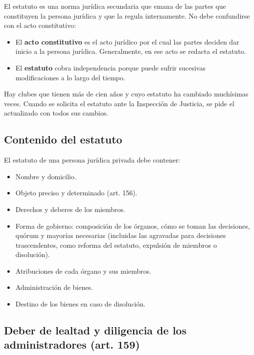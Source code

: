 \documentclass[12pt,oneside]{book}
\begin{document}
El estatuto es una norma jurídica secundaria que emana de las partes que constituyen la persona jurídica y que la regula internamente. No debe confundirse con el acto constitutivo:

\begin{itemize}
    \item El \textbf{acto constitutivo} es el acto jurídico por el cual las partes deciden dar inicio a la persona jurídica. Generalmente, en ese acto se redacta el estatuto.
    \item El \textbf{estatuto} cobra independencia porque puede sufrir sucesivas modificaciones a lo largo del tiempo.
\end{itemize}

\begin{note}
Hay clubes que tienen más de cien años y cuyo estatuto ha cambiado muchísimas veces. Cuando se solicita el estatuto ante la Inspección de Justicia, se pide el actualizado con todos sus cambios.
\end{note}

\subsection{Contenido del estatuto}

El estatuto de una persona jurídica privada debe contener:

\begin{itemize}
    \item Nombre y domicilio.
    \item Objeto preciso y determinado (art. 156).
    \item Derechos y deberes de los miembros.
    \item Forma de gobierno: composición de los órganos, cómo se toman las decisiones, quórum y mayorías necesarias (incluidas las agravadas para decisiones trascendentes, como reforma del estatuto, expulsión de miembros o disolución).
    \item Atribuciones de cada órgano y sus miembros.
    \item Administración de bienes.
    \item Destino de los bienes en caso de disolución.
\end{itemize}

\subsection{Deber de lealtad y diligencia de los administradores (art. 159)}
\end{document}
